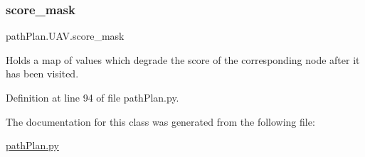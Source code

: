 \subsubsection{\texorpdfstring{score\+\_\+mask}{score\_mask}}
{\footnotesize\ttfamily path\+Plan.\+U\+A\+V.\+score\+\_\+mask}



Holds a map of values which degrade the score of the corresponding node after it has been visited. 



Definition at line 94 of file path\+Plan.\+py.



The documentation for this class was generated from the following file\+:\begin{DoxyCompactItemize}
\item 
\mbox{\hyperlink{path_plan_8py}{path\+Plan.\+py}}\end{DoxyCompactItemize}
